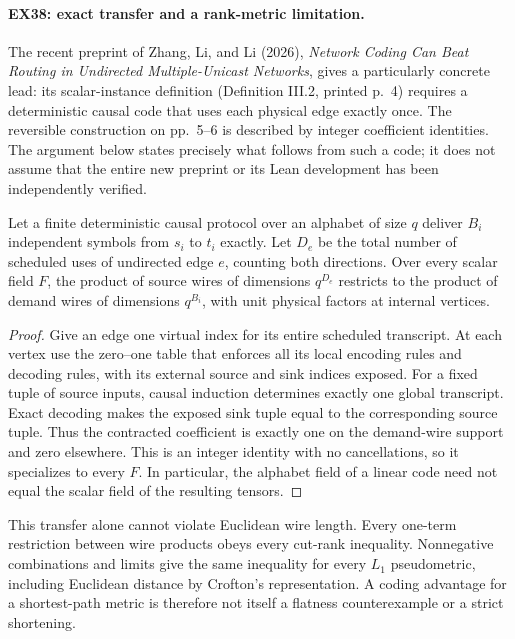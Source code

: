 \paragraph{EX38: exact transfer and a rank-metric limitation.}
The recent preprint of Zhang, Li, and Li (2026),
\emph{Network Coding Can Beat Routing in Undirected Multiple-Unicast
Networks}, gives a particularly concrete lead: its scalar-instance
definition (Definition III.2, printed p.~4) requires a deterministic
causal code that uses each physical edge exactly once. The reversible
construction on pp.~5--6 is described by integer coefficient identities.
The argument below states precisely what follows from such a code;
it does not assume that the entire new preprint or its Lean development
has been independently verified.

\begin{proposition}
Let a finite deterministic causal protocol over an alphabet of size $q$
deliver $B_i$ independent symbols from $s_i$ to $t_i$ exactly.
Let $D_e$ be the total number of scheduled uses of undirected edge $e$,
counting both directions. Over every scalar field $F$, the product of
source wires of dimensions $q^{D_e}$ restricts to the product of demand
wires of dimensions $q^{B_i}$, with unit physical factors at internal
vertices.
\end{proposition}
\begin{proof}
Give an edge one virtual index for its entire scheduled transcript.
At each vertex use the zero--one table that enforces all its local
encoding rules and decoding rules, with its external source and sink
indices exposed. For a fixed tuple of source inputs, causal induction
determines exactly one global transcript. Exact decoding makes the
exposed sink tuple equal to the corresponding source tuple. Thus the
contracted coefficient is exactly one on the demand-wire support and
zero elsewhere. This is an integer identity with no cancellations,
so it specializes to every $F$. In particular, the alphabet field of
a linear code need not equal the scalar field of the resulting tensors.
\end{proof}

This transfer alone cannot violate Euclidean wire length. Every
one-term restriction between wire products obeys every cut-rank
inequality. Nonnegative combinations and limits give the same inequality
for every $L_1$ pseudometric, including Euclidean distance by Crofton's
representation. A coding advantage for a shortest-path metric is
therefore not itself a flatness counterexample or a strict shortening.

